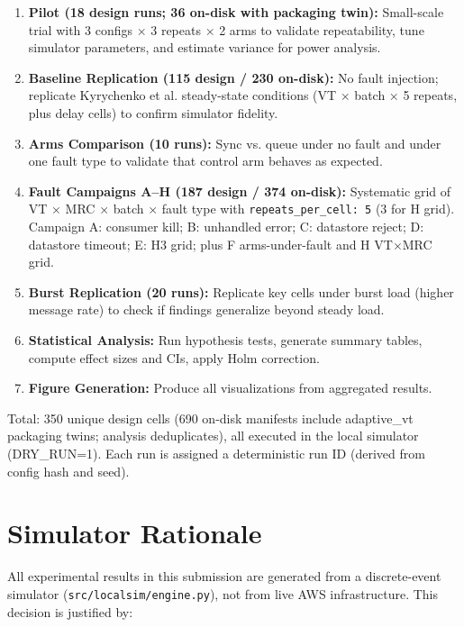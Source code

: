 \begin{enumerate}
    \item \textbf{Pilot (18 design runs; 36 on-disk with packaging twin):} Small-scale trial with 3 configs × 3 repeats × 2 arms to validate repeatability, tune simulator parameters, and estimate variance for power analysis.
    
    \item \textbf{Baseline Replication (115 design / 230 on-disk):} No fault injection; replicate Kyrychenko et al. steady-state conditions (VT × batch × 5 repeats, plus delay cells) to confirm simulator fidelity.
    
    \item \textbf{Arms Comparison (10 runs):} Sync vs. queue under no fault and under one fault type to validate that control arm behaves as expected.
    
    \item \textbf{Fault Campaigns A--H (187 design / 374 on-disk):} Systematic grid of VT × MRC × batch × fault type with \texttt{repeats\_per\_cell: 5} (3 for H grid). Campaign A: consumer kill; B: unhandled error; C: datastore reject; D: datastore timeout; E: H3 grid; plus F arms-under-fault and H VT×MRC grid.
    
    \item \textbf{Burst Replication (20 runs):} Replicate key cells under burst load (higher message rate) to check if findings generalize beyond steady load.
    
    \item \textbf{Statistical Analysis:} Run hypothesis tests, generate summary tables, compute effect sizes and CIs, apply Holm correction.
    
    \item \textbf{Figure Generation:} Produce all visualizations from aggregated results.
\end{enumerate}

Total: 350 unique design cells (690 on-disk manifests include adaptive\_vt packaging twins; analysis deduplicates), all executed in the local simulator (DRY\_RUN=1). Each run is assigned a deterministic run ID (derived from config hash and seed).

\section{Simulator Rationale}

All experimental results in this submission are generated from a discrete-event simulator (\texttt{src/localsim/engine.py}), not from live AWS infrastructure. This decision is justified by:

